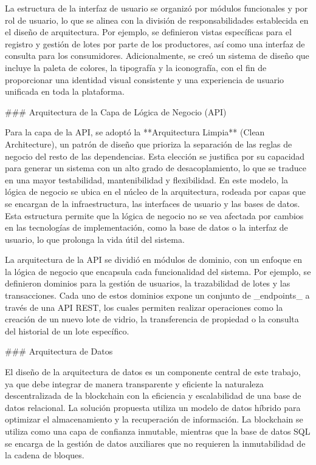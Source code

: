 La estructura de la interfaz de usuario se organizó por módulos funcionales y por rol de usuario, lo que se alinea con la división de responsabilidades establecida en el diseño de arquitectura. Por ejemplo, se definieron vistas específicas para el registro y gestión de lotes por parte de los productores, así como una interfaz de consulta para los consumidores. Adicionalmente, se creó un sistema de diseño que incluye la paleta de colores, la tipografía y la iconografía, con el fin de proporcionar una identidad visual consistente y una experiencia de usuario unificada en toda la plataforma.

### Arquitectura de la Capa de Lógica de Negocio (API)

Para la capa de la API, se adoptó la **Arquitectura Limpia** (Clean Architecture), un patrón de diseño que prioriza la separación de las reglas de negocio del resto de las dependencias. Esta elección se justifica por su capacidad para generar un sistema con un alto grado de desacoplamiento, lo que se traduce en una mayor testabilidad, mantenibilidad y flexibilidad. En este modelo, la lógica de negocio se ubica en el núcleo de la arquitectura, rodeada por capas que se encargan de la infraestructura, las interfaces de usuario y las bases de datos. Esta estructura permite que la lógica de negocio no se vea afectada por cambios en las tecnologías de implementación, como la base de datos o la interfaz de usuario, lo que prolonga la vida útil del sistema.

La arquitectura de la API se dividió en módulos de dominio, con un enfoque en la lógica de negocio que encapsula cada funcionalidad del sistema. Por ejemplo, se definieron dominios para la gestión de usuarios, la trazabilidad de lotes y las transacciones. Cada uno de estos dominios expone un conjunto de _endpoints_ a través de una API REST, los cuales permiten realizar operaciones como la creación de un nuevo lote de vidrio, la transferencia de propiedad o la consulta del historial de un lote específico.

### Arquitectura de Datos

El diseño de la arquitectura de datos es un componente central de este trabajo, ya que debe integrar de manera transparente y eficiente la naturaleza descentralizada de la blockchain con la eficiencia y escalabilidad de una base de datos relacional. La solución propuesta utiliza un modelo de datos híbrido para optimizar el almacenamiento y la recuperación de información. La blockchain se utiliza como una capa de confianza inmutable, mientras que la base de datos SQL se encarga de la gestión de datos auxiliares que no requieren la inmutabilidad de la cadena de bloques.

